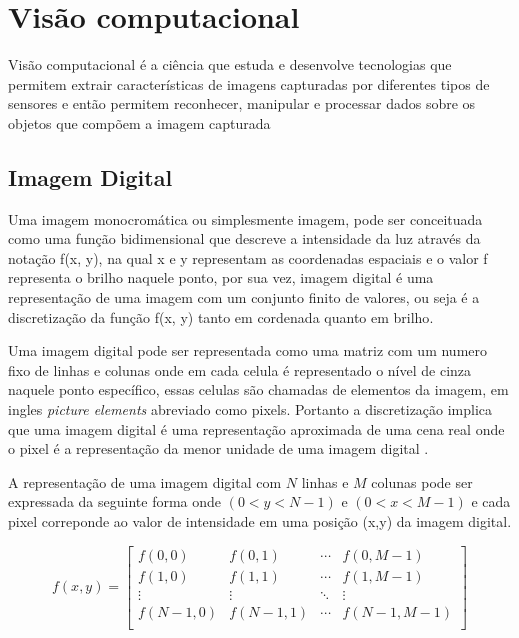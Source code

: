\section[Visão computacional]{Visão computacional}
Visão computacional é a ciência que estuda e desenvolve tecnologias que permitem extrair características de imagens capturadas por diferentes tipos de sensores e então permitem reconhecer, manipular e processar dados sobre os objetos que compõem a imagem capturada \cite{VisaoComp}

\subsection[Imagem Digital]{Imagem Digital}

Uma imagem monocromática ou simplesmente imagem,  pode ser conceituada como uma função bidimensional que descreve a intensidade da luz através da notação f(x, y), na qual x e y representam as coordenadas espaciais e o valor f representa  o brilho naquele ponto, por sua vez, imagem digital é uma representação de uma imagem com um conjunto finito de valores, ou seja é a discretização da função f(x, y) tanto em cordenada quanto em brilho\cite{imagemMonocromatica}.

Uma imagem digital pode ser representada como uma matriz com um numero fixo de linhas e colunas onde em cada celula é representado o nível de cinza naquele ponto específico, essas celulas são chamadas de elementos da imagem, em ingles \textit{picture elements} abreviado como pixels. Portanto a discretização implica que uma imagem digital é uma representação aproximada de uma cena real onde o pixel é a representação da menor unidade de uma imagem digital \cite{imagemMonocromatica}. 

 
 A representação de uma imagem digital com $N$ linhas e  $M$ colunas  pode ser expressada da seguinte forma onde $(0 < y < N-1)$  e $(0 < x < M-1)$ e cada pixel correponde  ao valor de intensidade em uma posição (x,y) da imagem digital.

\[
    f(x,y) = \left[
        \begin{array}{cccc}
        f(0,0) & f(0,1) & \cdots & f(0,M-1) \\
        f(1,0) & f(1,1) & \cdots & f(1,M-1) \\
        \vdots & \vdots & \ddots & \vdots \\
        f(N-1,0) & f(N-1,1) & \cdots & f(N-1,M-1) \\
        \end{array}
    \right]
\]


